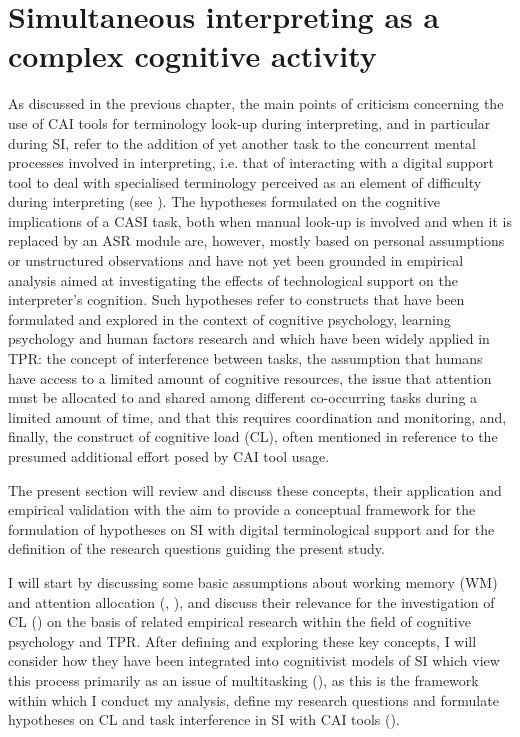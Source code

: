 \chapter{Simultaneous interpreting as a complex cognitive activity} \label{chapter3}\largerpage[2]

As discussed in the previous chapter, the main points of criticism concerning the use of CAI tools for terminology look-up during interpreting, and in particular during SI, refer to the addition of yet another task to the concurrent mental processes involved in interpreting, i.e. that of interacting with a digital support tool to deal with specialised terminology perceived as an element of difficulty during interpreting (see ). The hypotheses formulated on the cognitive implications of a CASI task, both when manual look-up is involved and when it is replaced by an ASR module are, however, mostly based on personal assumptions or unstructured observations and have not yet been grounded in empirical analysis aimed at investigating the effects of technological support on the interpreter's cognition. Such hypotheses refer to constructs that have been formulated and explored in the context of cognitive psychology, learning psychology and human factors research and which have been widely applied in TPR: the concept of interference between tasks, the assumption that humans have access to a limited amount of cognitive resources, the issue that attention must be allocated to and shared among different co-occurring tasks during a limited amount of time, and that this requires coordination and monitoring, and, finally, the construct of cognitive load (CL), often mentioned in reference to the presumed additional effort posed by CAI tool usage.

The present section will review and discuss these concepts, their application and empirical validation with the aim to provide a conceptual framework for the formulation of hypotheses on SI with digital terminological support and for the definition of the research questions guiding the present study.

\begin{sloppypar}
I will start by discussing some basic assumptions about working memory (WM) and attention allocation (, ), and discuss their relevance for the investigation of CL () on the basis of related empirical research within the field of cognitive psychology and TPR. After defining and exploring these key concepts, I will consider how they have been integrated into cognitivist models of SI which view this process primarily as an issue of multitasking (), as this is the framework within which I conduct my analysis, define my research questions and formulate hypotheses on CL and task interference in SI with CAI tools ().
\end{sloppypar}

